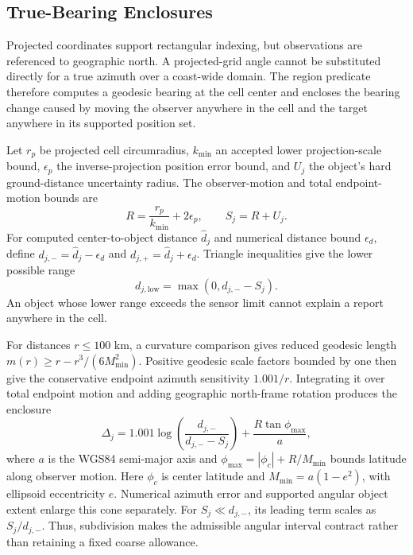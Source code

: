 \documentclass[conference]{IEEEtran}
\begin{document}
\subsection{True-Bearing Enclosures}
Projected coordinates support rectangular indexing, but observations are referenced to geographic north. A projected-grid angle cannot be substituted directly for a true azimuth over a coast-wide domain. The region predicate therefore computes a geodesic bearing at the cell center and encloses the bearing change caused by moving the observer anywhere in the cell and the target anywhere in its supported position set.

Let $r_p$ be projected cell circumradius, $k_{\min}$ an accepted lower projection-scale bound, $\epsilon_p$ the inverse-projection position error bound, and $U_j$ the object's hard ground-distance uncertainty radius. The observer-motion and total endpoint-motion bounds are
\begin{equation}
 R=\frac{r_p}{k_{\min}}+2\epsilon_p,
 \qquad S_j=R+U_j.
 \label{eq:motion}
\end{equation}
For computed center-to-object distance $\hat d_j$ and numerical distance bound $\epsilon_d$, define $d_{j,-}=\hat d_j-\epsilon_d$ and $d_{j,+}=\hat d_j+\epsilon_d$. Triangle inequalities give the lower possible range
\begin{equation}
 d_{j,\mathrm{low}}=\max(0,d_{j,-}-S_j).
 \label{eq:range}
\end{equation}
An object whose lower range exceeds the sensor limit cannot explain a report anywhere in the cell.

For distances $r\leq100$ km, a curvature comparison gives reduced geodesic length $m(r)\geq r-r^3/(6M_{\min}^2)$. Positive geodesic scale factors bounded by one then give the conservative endpoint azimuth sensitivity $1.001/r$. Integrating it over total endpoint motion and adding geographic north-frame rotation produces the enclosure
\begin{equation}
 \Delta_j=1.001\log\!\left(\frac{d_{j,-}}{d_{j,-}-S_j}\right)
       +\frac{R\tan\phi_{\max}}{a},
 \label{eq:cone}
\end{equation}
where $a$ is the WGS84 semi-major axis and $\phi_{\max}=|\phi_c|+R/M_{\min}$ bounds latitude along observer motion. Here $\phi_c$ is center latitude and $M_{\min}=a(1-e^2)$, with ellipsoid eccentricity $e$. Numerical azimuth error and supported angular object extent enlarge this cone separately. For $S_j\ll d_{j,-}$, its leading term scales as $S_j/d_{j,-}$. Thus, subdivision makes the admissible angular interval contract rather than retaining a fixed coarse allowance.
\end{document}
